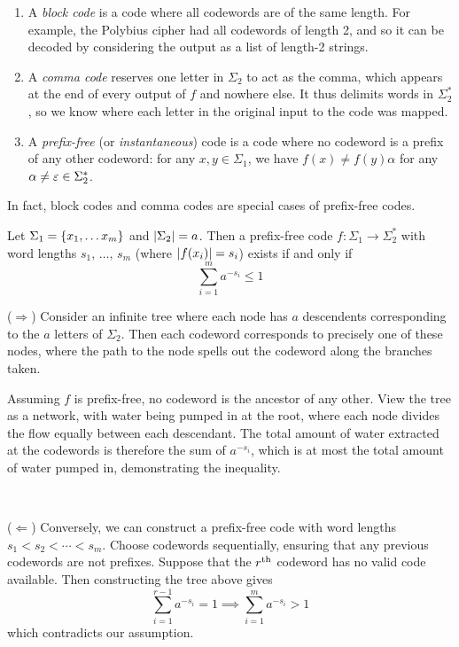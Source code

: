 \documentclass{article}
\begin{document}
\begin{enumerate}
    \item A \textit{block code} is a code where all codewords are of the same length. For example, the Polybius cipher had all codewords of length 2, and so it can be decoded by considering the output as a list of length-2 strings.
    \item A \textit{comma code} reserves one letter in $\Sigma_2$ to act as the comma, which appears at the end of every output of $f$ and nowhere else. It thus delimits words in $\Sigma_2^*$, so we know where each letter in the original input to the code was mapped.
    \item A \textit{prefix-free} (or \textit{instantaneous}) code is a code where no codeword is a prefix of any other codeword: for any $x, y \in \Sigma_1$, we have $f(x) \neq f(y)\alpha$ for any $\alpha \neq \varepsilon \in \Sigma_2^*$.
\end{enumerate}

\begin{note}
	In fact, block codes and comma codes are special cases of prefix-free codes.
\end{note}

\begin{theorem}
	\label{krafts-inequality}
    Let $\Sigma_1 = \left\lbrace x_1, \dots x_m \right\rbrace$
    and $\left\lvert \Sigma_2 \right\rvert = a$.
    Then a prefix-free code $f: \Sigma_1 \to \Sigma_2^*$
    with word lengths $s_1, \, \dots, \, s_m$
    (where $\left\lvert f(x_i) \right\rvert = s_i$)
    exists if and only if
    \[
	\sum_{i=1}^m a^{-s_i} \leq 1
	\]
\end{theorem}

\begin{prf}
    ($\Rightarrow$)
    Consider an infinite tree
    where each node has $a$ descendents
    corresponding to the $a$ letters of $\Sigma_2$.
    Then each codeword corresponds to precisely one of these nodes,
    where the path to the node spells out the codeword along the branches taken.
    
    Assuming $f$ is prefix-free,
    no codeword is the ancestor of any other.
    View the tree as a network, with water being pumped in at the root,
    where each node divides the flow equally between each descendant.
    The total amount of water extracted at the codewords is therefore
    the sum of $a^{-s_i}$,
    which is at most the total amount of water pumped in,
    demonstrating the inequality. 
    
    \ 
    
    ($\Leftarrow$)
    Conversely, we can construct a prefix-free code
    with word lengths $s_1 < s_2 < \cdots < s_m$.
    Choose codewords sequentially,
    ensuring that any previous codewords are not prefixes.
    Suppose that the $r^{\text{th}}$ codeword has no valid code available.
    Then constructing the tree above gives
    \[
	\sum_{i=1}^{r-1} a^{-s_i} = 1
	\implies
	\sum_{i=1}^{m} a^{-s_i} > 1
	\]
	which contradicts our assumption.
\end{prf}
\end{document}
